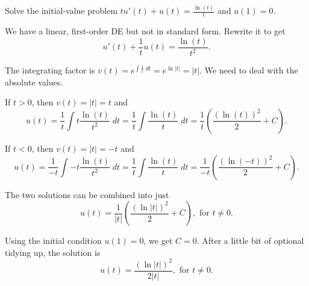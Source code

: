\documentclass[../main.tex]{subfiles}
\begin{document}
\begin{exercise}
  Solve the initial-value problem \(t u'(t) + u(t) = \frac{\ln(t)}{t}\) and \(u(1) = 0\).

  \begin{solution}
    We have a linear, first-order DE but not in standard form. Rewrite it to get
    \[
      u'(t) + \frac{1}{t} u(t) = \frac{\ln(t)}{t^{2}}.
    \]

    The integrating factor is \(v(t) = e^{\int \frac{1}{t} \;dt} = e^{\ln|t|} = |t|\).  We need to deal with the absolute values.

    If \(t > 0\), then \(v(t) = |t| = t\) and 
    \[
      u(t) = \frac{1}{t} \int t \frac{\ln(t)}{t^{2}} \;dt = \frac{1}{t} \int \frac{\ln(t)}{t} \;dt = \frac{1}{t}\left( \frac{\left( \ln(t) \right)^{2}}{2} + C \right).
    \]

    If \(t < 0\), then \(v(t) = |t| = -t\) and
    \[
      u(t) = \frac{1}{-t} \int -t \frac{\ln(t)}{t^{2}} \;dt = \frac{1}{t} \int \frac{\ln(t)}{t} \;dt = \frac{1}{-t}\left( \frac{\left( \ln(-t) \right)^{2}}{2} + C \right).
    \]

    The two solutions can be combined into just 
    \[
      u(t) = \frac{1}{|t|}\left( \frac{\left( \ln|t| \right)^{2}}{2} + C \right), \text{ for } t \ne 0.
    \]

    Using the initial condition \(u(1) = 0\), we get \(C = 0\). After a little bit of optional tidying up, the solution is
    \[
      u(t) = \frac{\left( \ln|t| \right)^{2}}{2|t|}, \text{ for } t \ne 0.
    \]

  \end{solution}
\end{exercise}
\end{document}
